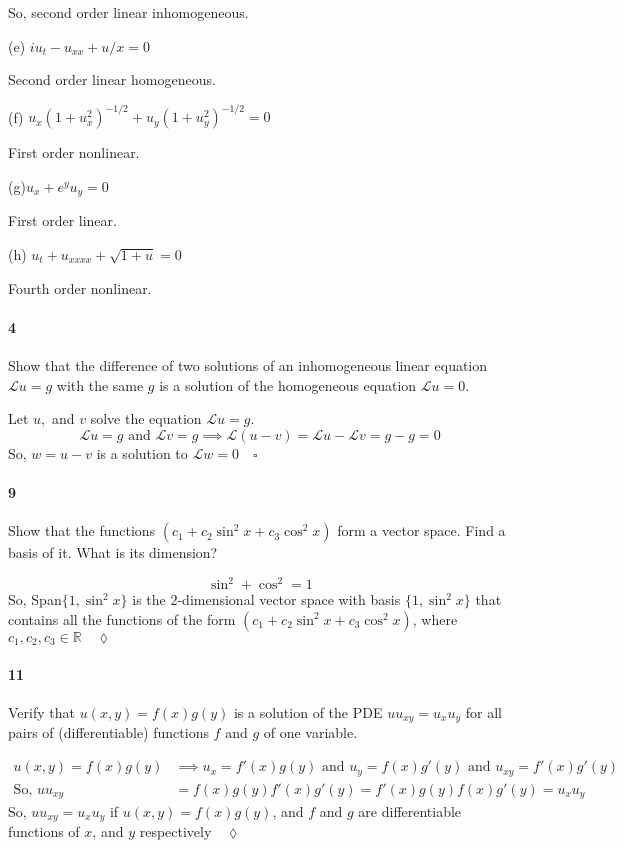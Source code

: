 \documentclass{article}
\newcommand\R{\mathbb{R}}
\newcommand\Lin{\mathcal{L}}
\begin{document}
So, second order linear inhomogeneous.

(e) $iu_t − u_{x x} + u/x = 0$

Second order linear homogeneous.

(f) $u_x(1 + u^2_x)^{-1/2}
+ u_y(1 + u^2_y )^{-1/2}
= 0$

First order nonlinear.

(g)$ u_x + e^y u_y = 0$

First order linear.

(h) $u_t + u_{x x x x} +\sqrt{ 1 + u} = 0$

Fourth order nonlinear.

\paragraph{4} Show that the difference of two solutions of an inhomogeneous linear
equation $\Lin u = g$ with the same $g$ is a solution of the homogeneous
equation $\Lin u = 0$.


Let $u,$ and $v$ solve the equation $\Lin u  = g$.
\[\Lin u = g\text{ and }\Lin v = g \implies \Lin(u-v) = \Lin u - \Lin
  v  = g - g = 0\]
So, $w = u-v$ is a solution to $\Lin w = 0\quad \square$
\newpage
\paragraph{9} Show that the functions $(c_1 + c_2 \sin^2 x + c_3 \cos^2 x)$ form a vector space.
Find a basis of it. What is its dimension?

\[\sin^2 + \cos^2 = 1\]
So, Span$\{1,\sin^2 x\}$  is the $2$-dimensional vector space with basis
$\{1, \sin^2 x\}$ that
contains all the functions of the form $(c_1 + c_2 \sin^2 x + c_3
\cos^2 x)$, where $c_1,c_2,c_3 \in \R\quad \lozenge$

\paragraph{11}  Verify that $u(x, y) = f(x)g(y)$ is a solution of the PDE $uu_{x y} = u_x u_y$ for
all pairs of (differentiable) functions $f$ and $g$ of one variable.

\begin{align*}
  u(x, y) = f(x)g(y) &\implies
   u_{x} = f'(x)g(y)
                     \text{ and } u_y = f(x)g'(y)
                     \text{ and } u_{xy} = f'(x)g'(y)\\
  \text{So, }uu_{xy} &=  f(x)g(y)f'(x)g'(y)
                     = f'(x)g(y)f(x)g'(y)
  = u_xu_y
\end{align*}
So, $uu_{xy} = u_xu_y$ if $u(x,y) = f(x)g(y)$, and $f$ and $g$ are
differentiable functions of $x$, and $y$ respectively$\quad \lozenge$
\end{document}
